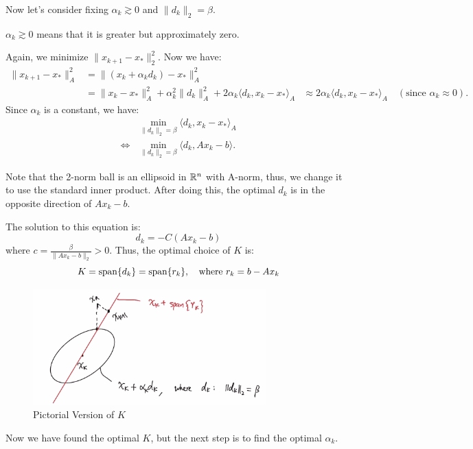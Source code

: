\documentclass[../main/main.tex]{subfiles}
\begin{document}
Now let's consider fixing $\alpha _{k}\gtrsim 0$ and $\|d_{k}\|_{2}=\beta $.
\begin{remark}
 $\alpha _{k}\gtrsim 0$ means that it is greater but approximately zero.
\end{remark}
Again, we minimize $\|x_{k+1}-x_{*}\|_{2}^2$. Now we have:
\begin{align*}
  \|x_{k+1} - x_{*}\|_{A}^2 &= \|(x_{k}+\alpha_{k}d_{k}) - x_{*}\|^2_{A} \\
  &= \| x_{k}- x_{*}\|^2_{A} + \alpha _{k}^2 \|d_{k}\|^2_{A} + 2\alpha _{k}\langle d_{k}, x_{k}-x_{*}\rangle_{A}
  &\approx 2\alpha _{k}\langle d_{k}, x_{k}-x_{*}\rangle_{A} \quad (\text{since }\alpha_{k}\approx 0)
  .\end{align*}
Since $\alpha_{k}$ is a constant, we have:
\begin{align*}
 & \min _{\|d_{k}\|_{2}=\beta } \langle d_{k}, x_{k}- x_{*}\rangle_{A} \\
\iff  & \min_{\|d_{k}\|_{2}=\beta }  \langle d_{k}, Ax_{k}-b\rangle
  .\end{align*}
\begin{remark}
Note that the 2-norm ball is an ellipsoid in $\mathbb{R} ^{n}$ with A-norm, thus, we change it to use the standard inner product. After doing this, the optimal $d_{k}$ is in the opposite direction of $Ax_{k}-b$.
\end{remark}
The solution to this equation is: \[
  d_{k} = -C(Ax_{k}-b)
\]where $c= \frac{\beta }{\|Ax_{k}-b\|_{2}}>0 $. Thus, the optimal choice of $K$ is: \[
K = \operatorname{span} \{d_{k}\} = \operatorname{span} \{r_{k}\}, \quad \text{where }r_{k} = b-Ax_{k}
\]
\begin{figure}[h!]
  \centering
  \includegraphics[width=0.8\textwidth]{../images/3-4-proj}
  \caption{Pictorial Version of $K$}
\end{figure}
Now we have found the optimal $K$, but the next step is to find the optimal $\alpha _{k}$.\\
\end{document}
